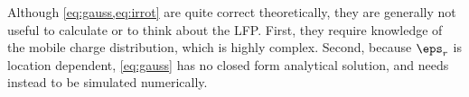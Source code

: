 Although \cref{eq:gauss,eq:irrot} are quite correct theoretically, they are generally not useful to calculate or to think about the LFP. First, they require knowledge of the mobile charge distribution, which is highly complex.\footnotemark{} Second, because $\eps_r$ is location dependent, \cref{eq:gauss} has no closed form analytical solution, and needs instead to be simulated numerically.




